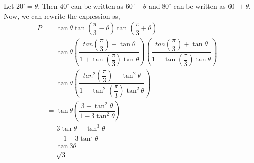\begin{solution}[\halfpage]
  Let $20^\circ=\theta$. Then $40^\circ$ can be written as $60^\circ -\theta$ and $80^\circ$ can be written as $60^\circ +\theta$. Now, we can rewrite the expression as,
  \begin{align}
    P &= \tan\theta\tan(\dfrac{\pi}{3}-\theta)
    	   \tan(\dfrac{\pi}{3}+\theta) \\
      &= \tan\theta
           \left(\dfrac{tan(\dfrac{\pi}{3})-\tan\theta}
                       {1+\tan(\dfrac{\pi}{3})\tan\theta}\right)
           \left(\dfrac{tan(\dfrac{\pi}{3})+\tan\theta}
                       {1-\tan(\dfrac{\pi}{3})\tan\theta}\right) \\
      &= \tan\theta
           \left(\dfrac{tan^2(\dfrac{\pi}{3})-\tan^2\theta}
                       {1-\tan^2(\dfrac{\pi}{3})\tan^2\theta}\right) \\
      &= \tan\theta
           \left(\dfrac{3-\tan^2\theta}
                       {1-3\tan^2\theta}\right) \\
      &= \dfrac{3\tan\theta-\tan^3\theta}{1-3\tan^2\theta} \\
      &= \tan 3\theta \\
      &= \sqrt{3}
  \end{align}
  
\end{solution}
